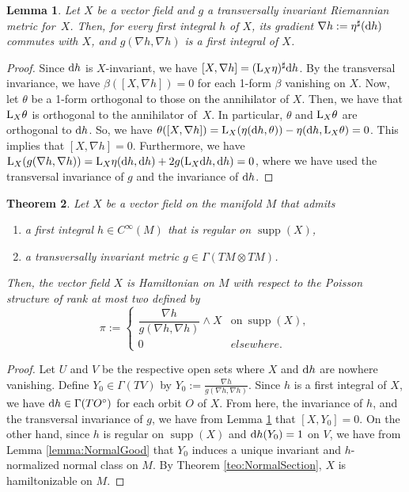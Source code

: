 \documentclass[10pt,a4paper]{amsart}
\newcommand{\dd}{{\rm d}}
\numberwithin{equation}{section}
\newtheorem{Theorem}{Theorem}[section]
\newtheorem{Lemma}[Theorem]{Lemma}
\begin{document}
\begin{Lemma}\label{lemma:TransInv}
Let $X$ be a vector field and $g$ a transversally invariant Riemannian metric for~$X$. Then, for every first integral $h$ of $X$, its gradient $\nabla h:=\eta^{\sharp}(\dd h)$ commutes with $X$, and $g(\nabla h,\nabla h)$ is a first integral of $X$.
\end{Lemma}
\begin{proof}
Since $\dd h$ is $X$-invariant, we have $[X,\nabla h] = ({\rm L}_{X}\eta)^{\sharp}\dd h$. By the transversal invariance, we have $\beta([X,\nabla h])=0$ for each 1-form $\beta$ vanishing on $X$. Now, let $\theta$ be a 1-form orthogonal to those on the annihilator of $X$. Then, we have that ${\rm L}_{X}\theta$ is orthogonal to the annihilator of~$X$. In particular, $\theta$ and ${\rm L}_{X}\theta$ are orthogonal to $\dd h$. So, we have $\theta([X,\nabla h]) = {\rm L}_{X}(\eta(\dd h,\theta)) - \eta(\dd h,{\rm L}_{X}\theta) = 0$. This implies that $[X,\nabla h]=0$. Furthermore, we have ${\rm L}_{X}(g(\nabla h,\nabla h))={\rm L}_{X}\eta(\dd h,\dd h) + 2g({\rm L}_{X}\dd h,\dd h)=0$, where we have used the transversal invariance of $g$ and the invariance of $\dd h$.
\end{proof}

\begin{Theorem}\label{teo:TrInvM}
Let $X$ be a vector field on the manifold $M$ that admits
 \begin{enumerate}\itemsep=0pt
 \item[$1)$] a first integral $h \in C^{\infty}(M)$ that is regular on $\operatorname{supp}(X)$,
 \item[$2)$] a transversally invariant metric $g \in \Gamma(TM \otimes TM)$.
 \end{enumerate}
Then, the vector field $X$ is Hamiltonian on $M$ with respect to the Poisson structure of rank at most two defined by
 \begin{equation*}
 \pi :=
 \begin{cases}
 \dfrac{\nabla h}{g(\nabla h,\nabla h)} \wedge X & \text{on} \ \operatorname{supp}(X), \\
 0 & elsewhere.
 \end{cases}
 \end{equation*}
\end{Theorem}
\begin{proof}
Let $U$ and $V$ be the respective open sets where $X$ and $\dd h$ are nowhere vanishing. Define $Y_0 \in \Gamma(TV)$ by $Y_0 := \frac{\nabla h}{g(\nabla h,\nabla h)}$. Since $h$ is a first integral of $X$, we have $\dd h \in \Gamma(TO^{\circ})$ for each orbit $O$ of $X$. From here, the invariance of $h$, and the transversal invariance of $g$, we have from Lemma \ref{lemma:TransInv} that $[X,Y_0] = 0$. On the other hand, since $h$ is regular on $\operatorname{supp}(X)$ and $\dd h(Y_0) = 1$ on $V$, we have from Lemma \ref{lemma:NormalGood} that $Y_{0}$ induces a unique invariant and $h$-normalized normal class on $M$. By Theorem \ref{teo:NormalSection}, $X$ is hamiltonizable on $M$.
\end{proof}
\end{document}
